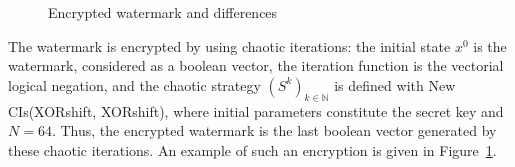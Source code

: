 \begin{figure}[!t]
\centering
{}
\hfil
{}
\caption{Encrypted watermark and differences}
\label{Encrypted watermark and differences}
\end{figure}

The watermark is encrypted by using chaotic iterations: the initial state $x^{0}$ is the watermark, considered as a boolean vector, the iteration function is the vectorial logical negation, and the chaotic strategy $(S^{k})_{k\in \mathds{N}}$ is defined with New CIs(XORshift, XORshift), where initial parameters constitute the secret key and $N=64$. Thus, the encrypted watermark is the last boolean vector generated by these chaotic iterations. An example of such an encryption is given in Figure~\ref{Encrypted watermark and differences}.


